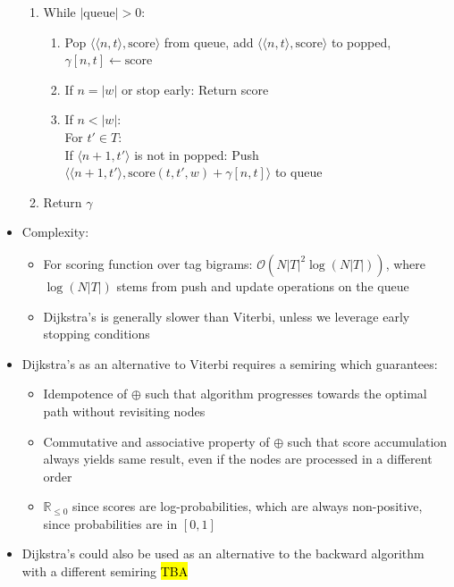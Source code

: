 \begin{itemize}
\begin{enumerate}
        \item While $|\textrm{queue}| > 0$:
        \begin{enumerate}
            \item Pop $\langle \langle n, t \rangle, \textrm{score} \rangle$ from queue, add $\langle \langle n, t \rangle, \textrm{score} \rangle$ to popped, 
            $
            \gamma[n, t] \gets \textrm{score}
            $
            \item If $n = |w|$ or stop early: Return score    
            \item If $n < |w|$:\\
            For $t' \in T$:\\
            If $\langle n+1, t' \rangle$ is not in popped:
            Push
            $
            \langle \langle n+1, t' \rangle, \textrm{score}(t, t', w) + \gamma[n, t] \rangle
            $
            to queue
        \end{enumerate}
        \item Return $\gamma$
    \end{enumerate}
    \item Complexity:
    \begin{itemize}
        \item For scoring function over tag bigrams: $\mathcal{O}(N |T|^2 \log(N |T|))$, where $\log(N |T|)$ stems from push and update operations on the queue
        \item Dijkstra's is generally slower than Viterbi, unless we leverage early stopping conditions
    \end{itemize}
    \item Dijkstra's as an alternative to Viterbi requires a semiring which guarantees:
    \begin{itemize}
        \item Idempotence of $\oplus$ such that algorithm progresses towards the optimal path without revisiting nodes
        \item Commutative and associative property of $\oplus$ such that score accumulation always yields same result, even if the nodes are processed in a different order
        \item $\mathbb{R}_{\leq0}$ since scores are log-probabilities, which are always non-positive, since probabilities are in $[0,1]$
    \end{itemize}
    \item Dijkstra's could also be used as an alternative to the backward algorithm with a different semiring
    \hl{TBA}
\end{itemize}

